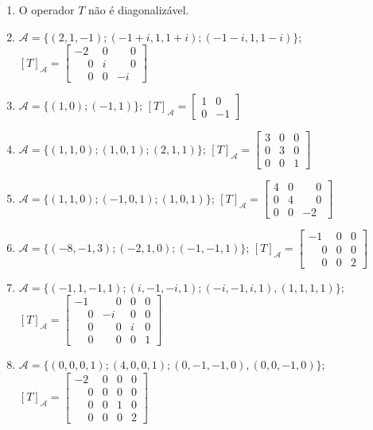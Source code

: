 \documentclass[12pt]{exam}
\begin{document}
\begin{exercicio}
\begin{solucao}
\begin{enumerate}[label=({\alph*})]
          \item O operador $T$ n\~ao \'e diagonaliz\'avel.
          \item $\mathcal{A} = \{(2,1,-1);(-1 + i, 1, 1 + i);(-1 - i, 1, 1 - i)\}$; $[T]_\mathcal{A} = \begin{bmatrix} -2 & 0 & \phantom{-} 0\\ \phantom{-} 0 & i & \phantom{-} 0\\ \phantom{-} 0 & 0 & -i\end{bmatrix}$
          \item $\mathcal{A} = \{(1,0);(-1,1)\}$; $[T]_\mathcal{A} = \begin{bmatrix} 1 & 0\\ 0 & -1\end{bmatrix}$
          \item $\mathcal{A} = \{(1,1,0);(1,0,1);(2,1,1)\}$; $[T]_\mathcal{A} = \begin{bmatrix} 3 & 0 & 0\\ 0 & 3 & 0\\ 0 & 0 & 1\end{bmatrix}$
          \item $\mathcal{A} = \{(1,1,0);(-1,0,1);(1,0,1)\}$; $[T]_\mathcal{A} = \begin{bmatrix} 4 & 0 & \phantom{-} 0\\ 0 & 4 & \phantom{-} 0\\ 0 & 0 & -2\end{bmatrix}$
          \item $\mathcal{A} = \{(-8,-1,3);(-2,1,0);(-1,-1,1)\}$; $[T]_\mathcal{A} = \begin{bmatrix} -1 & 0 & 0\\ \phantom{-} 0 & 0 & 0\\ \phantom{-} 0 & 0 & 2\end{bmatrix}$
          \item $\mathcal{A} = \{(-1,1,-1,1); (i,-1,-i,1); (-i,-1,i,1), (1,1,1,1)\}$; $[T]_\mathcal{A} = \begin{bmatrix} -1 & \phantom{-}0 & 0 & 0\\ \phantom{-} 0 & -i & 0 & 0\\ \phantom{-} 0 & \phantom{-}0 & i & 0\\ \phantom{-}0 & \phantom{-}0 & 0 & 1\end{bmatrix}$
          \item $\mathcal{A} = \{(0,0,0,1); (4,0,0,1); (0,-1,-1,0), (0,0,-1,0)\}$; $[T]_\mathcal{A} = \begin{bmatrix} -2 & 0 & 0 & 0\\ \phantom{-} 0 & 0 & 0 & 0\\ \phantom{-} 0 & 0 & 1 & 0\\ \phantom{-}0 & 0 & 0 & 2\end{bmatrix}$
        \end{enumerate}
  \end{solucao}
\end{exercicio}
\end{document}
